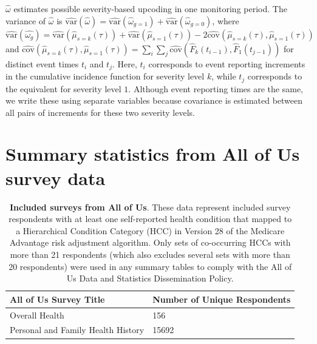\documentclass[
  12pt,
  number,
  doubleblind]{elsarticle}
\begin{document}
\(\widehat{\omega}\) estimates possible severity-based upcoding in one
monitoring period. The variance of \(\widehat{\omega}\) is
\(\widehat{\text{var}}(\widehat{\omega}) = \widehat{\text{var}}(\widehat{\omega}_{g=1}) + \widehat{\text{var}}(\widehat{\omega}_{g=0})\),
where
\(\widehat{\text{var}}(\widehat{\omega_g}) = \widehat{\text{var}}(\hat{\mu}_{s=k}(\tau)) + \widehat{\text{var}}(\hat{\mu}_{s=1}(\tau)) - 2\widehat{\text{cov}}(\hat{\mu}_{s=k}(\tau), \hat{\mu}_{s=1}(\tau))\)
and
\(\widehat{\text{cov}}(\hat{\mu}_{s=k}(\tau), \hat{\mu}_{s=1}(\tau)) = \sum_{i} \sum_j \widehat{\text{cov}}(\hat{F}_k(t_{i-1}), \hat{F}_1(t_{j-1}))\)
for distinct event times \(t_i\) and \(t_j\). Here, \(t_i\) corresponds
to event reporting increments in the cumulative incidence function for
severity level \(k\), while \(t_j\) corresponds to the equivalent for
severity level \(1\). Although event reporting times are the same, we
write these using separate variables because covariance is estimated
between all pairs of increments for these two severity levels.

\newpage{}

\section{Summary statistics from All of Us survey
data}\label{sec-allofus}

\begin{longtable}[]{@{}ll@{}}

\caption{\label{tbl-aousurveys}\textbf{Included surveys from All of Us}.
These data represent included survey respondents with at least one
self-reported health condition that mapped to a Hierarchical Condition
Category (HCC) in Version 28 of the Medicare Advantage risk adjustment
algorithm. Only sets of co-occurring HCCs with more than 21 respondents
(which also excludes several sets with more than 20 respondents) were
used in any summary tables to comply with the All of Us Data and
Statistics Dissemination Policy.}

\tabularnewline

\toprule\noalign{}
All of Us Survey Title & Number of Unique Respondents \\
\midrule\noalign{}
\endhead
\bottomrule\noalign{}
\endlastfoot
Overall Health & 156 \\
Personal and Family Health History & 15692 \\

\end{longtable}
\end{document}
